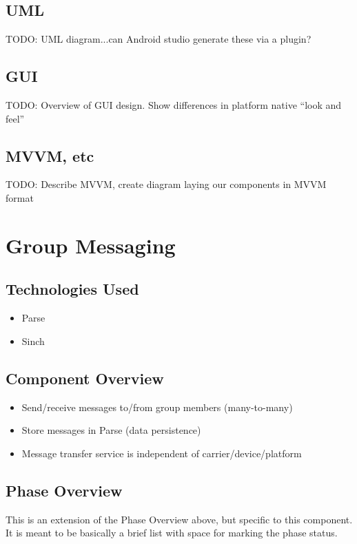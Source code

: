  \subsection{UML}
 TODO: UML diagram...can Android studio generate these via a plugin?
 
 \subsection{GUI}
 TODO: Overview of GUI design. Show differences in platform native ``look and feel''
 
 \subsection{MVVM, etc}
 TODO: Describe MVVM, create diagram laying our components in MVVM format

\section{Group Messaging }

\subsection{Technologies  Used}
\begin{itemize}
  \item Parse
  \item Sinch
\end{itemize}

\subsection{Component  Overview}
\begin{itemize}
  \item Send/receive messages to/from group members (many-to-many)
  \item Store messages in Parse (data persistence)
  \item Message transfer service is independent of carrier/device/platform
\end{itemize} 

\subsection{Phase Overview}
This is an extension of the Phase Overview above, but specific to this component. 
 It is meant to be basically a brief list with space for marking the phase status. 


